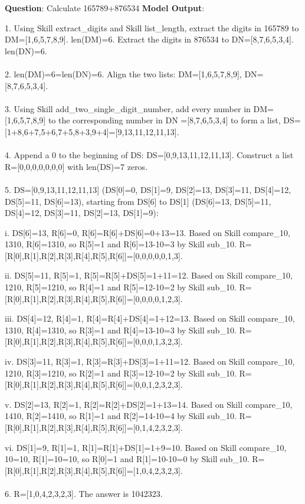 \documentclass{article} \usepackage{arxiv}
\begin{document}
\newpage

\begin{tcolorbox}[title = {Addition}, colback = Apricot!25!white, colframe = BrickRed!75!black,fontlower =\fontsize{9pt}{9pt}\selectfont] 
\textbf{Question}: Calculate 165789+876534
\tcblower
\textbf{Model Output}:

\quad

1. Using Skill extract\_digits and Skill list\_length, extract the digits in 165789 to DM=[1,6,5,7,8,9].  len(DM)=6. Extract the digits in 876534 to DN=[8,7,6,5,3,4]. len(DN)=6. \\ \\
2. len(DM)=6=len(DN)=6. Align the two lists: DM=[1,6,5,7,8,9], DN=[8,7,6,5,3,4]. \\ \\
3. Using Skill add\_two\_single\_digit\_number, add every number in DM=[1,6,5,7,8,9] to the corresponding  number in DN =[8,7,6,5,3,4] to form a list, DS=[1+8,6+7,5+6,7+5,8+3,9+4]=[9,13,11,12,11,13]. \\ \\
4. Append a 0 to the beginning of DS: DS=[0,9,13,11,12,11,13]. Construct a list R=[0,0,0,0,0,0,0] with len(DS)=7 zeros. \\ \\
5. DS=[0,9,13,11,12,11,13] (DS[0]=0, DS[1]=9, DS[2]=13, DS[3]=11, DS[4]=12, DS[5]=11, DS[6]=13), starting from DS[6] to DS[1] (DS[6]=13, DS[5]=11, DS[4]=12, DS[3]=11, DS[2]=13, DS[1]=9): 

\quad

    \qquad i. DS[6]=13, R[6]=0, R[6]=R[6]+DS[6]=0+13=13. Based on Skill compare\_10, 1310, R[6]=1310, so R[5]=1 and R[6]=13-10=3 by Skill sub\_10. R=[R[0],R[1],R[2],R[3],R[4],R[5],R[6]]=[0,0,0,0,0,1,3]. 
    
    \qquad ii. DS[5]=11, R[5]=1, R[5]=R[5]+DS[5]=1+11=12. Based on Skill compare\_10, 1210, R[5]=1210, so R[4]=1 and R[5]=12-10=2 by Skill sub\_10. R=[R[0],R[1],R[2],R[3],R[4],R[5],R[6]]=[0,0,0,0,1,2,3]. 

    
    \qquad iii. DS[4]=12, R[4]=1, R[4]=R[4]+DS[4]=1+12=13. Based on Skill compare\_10, 1310, R[4]=1310, so R[3]=1 and R[4]=13-10=3 by Skill sub\_10. R=[R[0],R[1],R[2],R[3],R[4],R[5],R[6]]=[0,0,0,1,3,2,3]. 
    
    \qquad iv. DS[3]=11, R[3]=1, R[3]=R[3]+DS[3]=1+11=12. Based on Skill compare\_10, 1210, R[3]=1210, so R[2]=1 and R[3]=12-10=2 by Skill sub\_10. R=[R[0],R[1],R[2],R[3],R[4],R[5],R[6]]=[0,0,1,2,3,2,3]. 
    
    \qquad v. DS[2]=13, R[2]=1, R[2]=R[2]+DS[2]=1+13=14. Based on Skill compare\_10, 1410, R[2]=1410, so R[1]=1 and R[2]=14-10=4 by Skill sub\_10. R=[R[0],R[1],R[2],R[3],R[4],R[5],R[6]]=[0,1,4,2,3,2,3]. 
    
    \qquad vi. DS[1]=9, R[1]=1, R[1]=R[1]+DS[1]=1+9=10. Based on Skill compare\_10, 10=10, R[1]=10=10, so R[0]=1 and R[1]=10-10=0 by Skill sub\_10. R=[R[0],R[1],R[2],R[3],R[4],R[5],R[6]]=[1,0,4,2,3,2,3]. \\ \\
6. R=[1,0,4,2,3,2,3]. The answer is 1042323. 
\end{tcolorbox}
\end{document}
